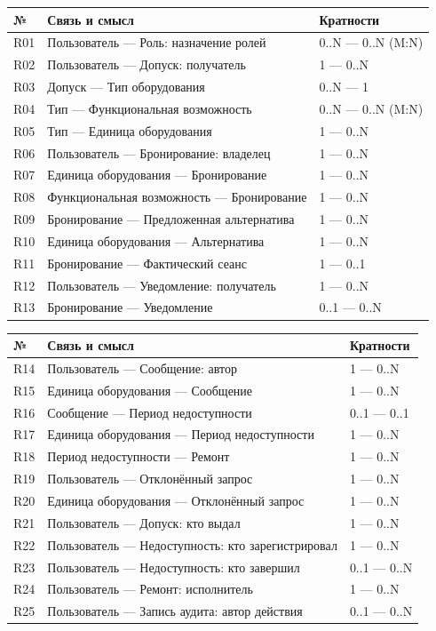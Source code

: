 \documentclass[14pt]{extarticle}
\begin{document}
\begin{minipage}[t]{.49\linewidth}
\begin{tabular}{@{}lll@{}}\toprule № & Связь и смысл & Кратности\\\midrule
R01 & Пользователь — Роль: назначение ролей & 0..N — 0..N (M:N)\\
R02 & Пользователь — Допуск: получатель & 1 — 0..N\\
R03 & Допуск — Тип оборудования & 0..N — 1\\
R04 & Тип — Функциональная возможность & 0..N — 0..N (M:N)\\
R05 & Тип — Единица оборудования & 1 — 0..N\\
R06 & Пользователь — Бронирование: владелец & 1 — 0..N\\
R07 & Единица оборудования — Бронирование & 1 — 0..N\\
R08 & Функциональная возможность — Бронирование & 1 — 0..N\\
R09 & Бронирование — Предложенная альтернатива & 1 — 0..N\\
R10 & Единица оборудования — Альтернатива & 1 — 0..N\\
R11 & Бронирование — Фактический сеанс & 1 — 0..1\\
R12 & Пользователь — Уведомление: получатель & 1 — 0..N\\
R13 & Бронирование — Уведомление & 0..1 — 0..N\\
\bottomrule\end{tabular}\end{minipage}
\hfill
\begin{minipage}[t]{.49\linewidth}
\begin{tabular}{@{}lll@{}}\toprule № & Связь и смысл & Кратности\\\midrule
R14 & Пользователь — Сообщение: автор & 1 — 0..N\\
R15 & Единица оборудования — Сообщение & 1 — 0..N\\
R16 & Сообщение — Период недоступности & 0..1 — 0..1\\
R17 & Единица оборудования — Период недоступности & 1 — 0..N\\
R18 & Период недоступности — Ремонт & 1 — 0..N\\
R19 & Пользователь — Отклонённый запрос & 1 — 0..N\\
R20 & Единица оборудования — Отклонённый запрос & 1 — 0..N\\
R21 & Пользователь — Допуск: кто выдал & 1 — 0..N\\
R22 & Пользователь — Недоступность: кто зарегистрировал & 1 — 0..N\\
R23 & Пользователь — Недоступность: кто завершил & 0..1 — 0..N\\
R24 & Пользователь — Ремонт: исполнитель & 1 — 0..N\\
R25 & Пользователь — Запись аудита: автор действия & 0..1 — 0..N\\
\bottomrule\end{tabular}\end{minipage}
\end{document}
